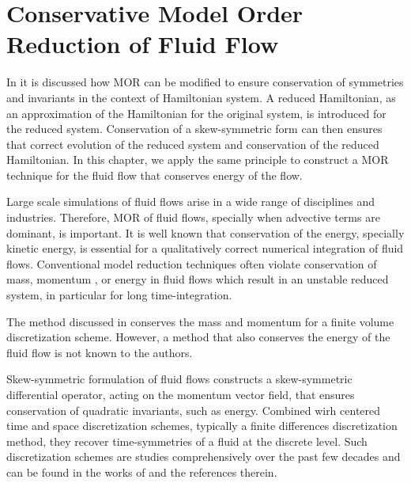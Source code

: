 \chapter{Conservative Model Order Reduction of Fluid Flow} \label{chapter:7}

In  it is discussed how MOR can be modified to ensure conservation of symmetries and invariants in the context of Hamiltonian system. A reduced Hamiltonian, as an approximation of the Hamiltonian for the original system, is introduced for the reduced system. Conservation of a skew-symmetric form can then ensures that correct evolution of the reduced system and conservation of the reduced Hamiltonian. In this chapter, we apply the same principle to construct a MOR technique for the fluid flow that conserves energy of the flow.

Large scale simulations of fluid flows arise in a wide range of disciplines and industries. Therefore, MOR of fluid flows, specially when advective terms are dominant, is important. It is well known that conservation of the energy, specially kinetic energy, is essential for a qualitatively correct numerical integration of fluid flows. Conventional model reduction techniques often violate conservation of mass, momentum \cite{carlberg2018conservative}, or energy in fluid flows which result in an unstable reduced system, in particular for long time-integration. 

The method discussed in \cite{carlberg2018conservative} conserves the mass and momentum for a finite volume discretization scheme. However, a method that also conserves the energy of the fluid flow is not known to the authors.

Skew-symmetric formulation of fluid flows constructs a skew-symmetric differential operator, acting on the momentum vector field, that ensures conservation of quadratic invariants, such as energy. Combined wirh centered time and space discretization schemes, typically a finite differences discretization method, they recover time-symmetries of a fluid at the discrete level. Such discretization schemes are studies comprehensively over the past few decades and can be found in the works of \cite{morinishi2010skew,morinishi1998fully,desjardins2008high,tadmor1984skew,reiss2014conservative} and the references therein.

